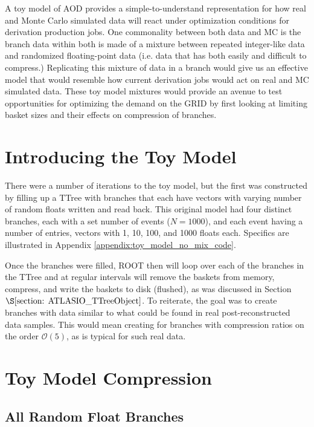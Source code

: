A toy model of AOD provides a simple-to-understand representation for how real and Monte Carlo simulated data will react under optimization conditions for derivation production jobs. 
One commonality between both data and MC is the branch data within both is made of a mixture between repeated integer-like data and randomized floating-point data (i.e. data that has both easily and difficult to compress.)
Replicating this mixture of data in a branch would give us an effective model that would resemble how current derivation jobs would act on real and MC simulated data. 
These toy model mixtures would provide an avenue to test opportunities for optimizing the demand on the GRID by first looking at limiting basket sizes and their effects on compression of branches. 

\section{Introducing the Toy Model}

There were a number of iterations to the toy model, but the first was constructed by filling up a TTree with branches that each have vectors with varying number of random floats written and read back.
This original model had four distinct branches, each with a set number of events ($N=1000$), and each event having a number of entries, vectors with 1, 10, 100, and 1000 floats each.
Specifics are illustrated in Appendix \ref{appendix:toy_model_no_mix_code}.

Once the branches were filled, ROOT then will loop over each of the branches in the TTree and at regular intervals will remove the baskets from memory, compress, and write the baskets to disk (flushed), as was discussed in Section $\S \ref{section: ATLASIO_TTreeObject}$.
To reiterate, the goal was to create branches with data similar to what could be found in real post-reconstructed data samples.
This would mean creating for branches with compression ratios on the order $\mathcal{O}(5)$, as is typical for such real data. 


\section{Toy Model Compression}

\subsection{All Random Float Branches}

